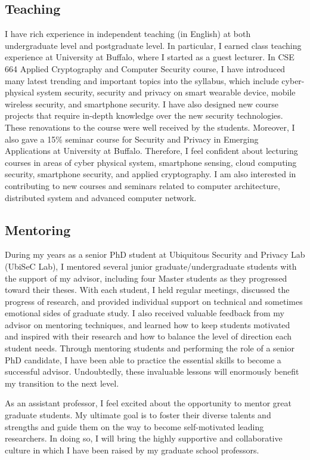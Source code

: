 \documentclass[11pt]{article}
\begin{document}
\subsection*{Teaching} 
 I have rich experience in independent teaching (in English) at both undergraduate level and postgraduate level. In particular, I earned class teaching experience at University at Buffalo, where I started as a guest lecturer. In CSE 664 Applied Cryptography and Computer Security course, I have introduced many latest trending and important topics into the syllabus, which include cyber-physical system security, security and privacy on smart wearable device, mobile wireless security, and smartphone security. I have also designed new course projects that require in-depth knowledge over the new security technologies. These renovations to the course were well received by the students. Moreover, I also gave a 15\% seminar course for Security and Privacy in Emerging Applications at University at Buffalo. Therefore, I feel confident about lecturing courses in areas of cyber physical system, smartphone sensing, cloud computing security, smartphone security, and applied cryptography. I am also interested in contributing to new courses and seminars related to computer architecture, distributed system and advanced computer network. 
\subsection*{Mentoring}
 During my years as a senior PhD student at Ubiquitous Security and Privacy Lab (UbiSeC Lab), I mentored several junior graduate/undergraduate students with the support of my advisor, including four Master students as they progressed toward their theses. With each student, I held regular meetings, discussed the progress of research, and provided individual support on technical and sometimes emotional sides of graduate study. I also received valuable feedback from my advisor on mentoring techniques, and learned how to keep students motivated and inspired with their research and how to balance the level of direction each student needs. Through mentoring students and performing the role of a senior PhD candidate, I have been able to practice the essential skills to become a successful advisor. Undoubtedly, these invaluable lessons will enormously benefit my transition to the next level. 

As an assistant professor, I feel excited about the opportunity to mentor great graduate students. My ultimate goal is to foster their diverse talents and strengths and guide them on the way to become self-motivated leading researchers. In doing so, I will bring the highly supportive and collaborative culture in which I have been raised by my graduate school professors.
\end{document}
